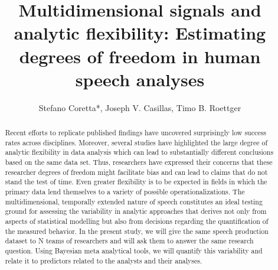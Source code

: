 \documentclass[Review,times,sageh]{sagej}
\begin{document}
\title{Multidimensional signals and analytic flexibility: Estimating degrees of freedom in human speech analyses}


\author{Stefano Coretta*, Joseph V. Casillas, Timo B. Roettger}




\begin{abstract}
Recent efforts to replicate published findings have uncovered surprisingly low success rates across disciplines. Moreover, several studies have highlighted the large degree of analytic flexibility in data analysis which can lead to substantially different conclusions based on the same data set. Thus, researchers have expressed their concerns that these researcher degrees of freedom might facilitate bias and can lead to claims that do not stand the test of time. Even greater flexibility is to be expected in fields in which the primary data lend themselves to a variety of possible operationalizations. The multidimensional, temporally extended nature of speech constitutes an ideal testing ground for assessing the variability in analytic approaches that derives not only from aspects of statistical modelling but also from decisions regarding the quantification of the measured behavior. In the present study, we will give the same speech production dataset to N teams of researchers and will ask them to answer the same research question. Using Bayesian meta analytical tools, we will quantify this variability and relate it to predictors related to the analysts and their analyses.
\end{abstract}


\maketitle
\end{document}
